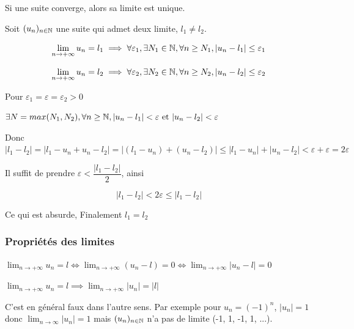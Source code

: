 \documentclass[a4paper, 12pt]{article}
\begin{document}
\begin{proposition}
    Si une suite converge, alors sa limite est unique.
\end{proposition}

\begin{demonstration}
    Soit $(u_n)_{n \in \mathbb{N}}$ une suite qui admet deux limite, $l_1 \neq l_2$.
    
    $$
    \lim_{n \to +\infty}u_n = l_1 \implies
    \forall \varepsilon_1, \exists N_1 \in \mathbb{N}, \forall n \geq N_1, |u_n - l_1| \leq \varepsilon_1
    $$
    
    $$
    \lim_{n \to +\infty}u_n = l_2 \implies
    \forall \varepsilon_2, \exists N_2 \in \mathbb{N}, \forall n \geq N_2, |u_n - l_2| \leq \varepsilon_2
    $$

    Pour $\varepsilon_1 = \varepsilon = \varepsilon_2 \gt 0$
    
    $\exists N = max(N_1, N_2), \forall n \geq \mathbb{N}, |u_n - l_1| < \varepsilon \text{ et } |u_n - l_2| < \varepsilon$

    Donc $|l_1 - l_2| = |l_1 - u_n + u_n - l_2| = |(l_1 - u_n) + (u_n - l_2)| \leq |l_1 - u_n| + |u_n - l_2| \lt \varepsilon + \varepsilon = 2 \varepsilon$

    Il suffit de prendre $\varepsilon \lt \dfrac{|l_1 - l_2|}{2}$, ainsi

    $$
    |l_1 - l_2| \lt 2\varepsilon \leq |l_1 - l_2|
    $$

    \begin{rdem}
        Ce qui est absurde, Finalement $l_1 = l_2$
    \end{rdem}
\end{demonstration}

\subsubsection{Propriétés des limites}

\begin{proprietes}
    \item $\lim_{n \to +\infty} u_n = l \iff \lim_{n \to +\infty}(u_n - l) = 0 \iff \lim_{n \to +\infty} |u_n - l| = 0$
    \item $\lim_{n \to +\infty} u_n = l \implies \lim_{n \to +\infty}|u_n| = |l|$
\end{proprietes}

\begin{remark}
    C'est en général faux dans l'autre sens. Par exemple pour $u_n = (-1)^n$,
    $|u_n|=1$ donc $\lim_{n \to \infty} |u_n| = 1$ mais $(u_n)_{n \in \mathbb{N}}$ n'a pas de limite (-1, 1, -1, 1, ...).
\end{remark}
\end{document}

